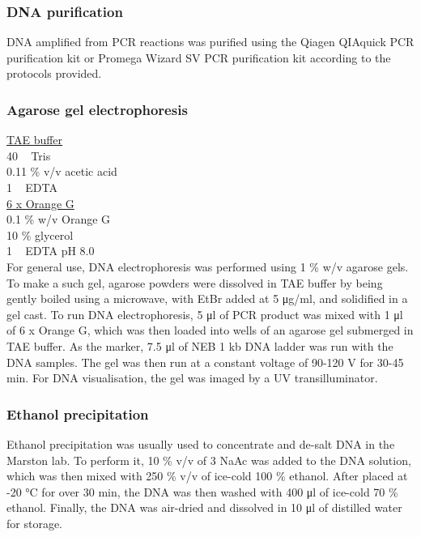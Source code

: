 
\subsubsection{DNA purification}

DNA amplified from PCR reactions was purified using the Qiagen QIAquick PCR purification kit or Promega Wizard SV PCR purification kit according to the protocols provided. 

\subsubsection{Agarose gel electrophoresis}

\underline{TAE buffer}\\
40 \si{\milli\Molar} Tris\\
0.11 \% v/v acetic acid\\
1 \si{\milli\Molar} EDTA \\

\underline{6 x Orange G}\\
0.1 \% w/v Orange G\\
10 \% glycerol\\
1 \si{\milli\Molar} EDTA pH 8.0\\

For general use, DNA electrophoresis was performed using 1 \% w/v agarose gels. To make a such gel, agarose powders were dissolved in TAE buffer by being gently boiled using a microwave, with EtBr added at 5 \si{\micro\gram/\milli\litre}, and solidified in a gel cast. To run DNA electrophoresis, 5 \si{\micro\litre} of PCR product was mixed with 1 \si{\micro\litre} of 6 x Orange G, which was then loaded into wells of an agarose gel submerged in TAE buffer. As the marker, 7.5 \si{\micro\litre} of NEB 1 kb DNA ladder was run with the DNA samples. The gel was then run at a constant voltage of 90-120 \si{\volt} for 30-45 \si{\minute}. For DNA visualisation, the gel was imaged by a UV transilluminator. 


\subsubsection{Ethanol precipitation}

Ethanol precipitation was usually used to concentrate and de-salt DNA in the Marston lab. To perform it, 10 \% v/v of 3 \si{\Molar} NaAc was added to the DNA solution, which was then mixed with 250 \% v/v of ice-cold 100 \% ethanol. After placed at -20 \si{\celsius} for over 30 \si{\minute}, the DNA was then washed with 400 \si{\micro\litre} of ice-cold 70 \% ethanol. Finally, the DNA was air-dried and dissolved in 10 \si{\micro\litre} of distilled water for storage. 

